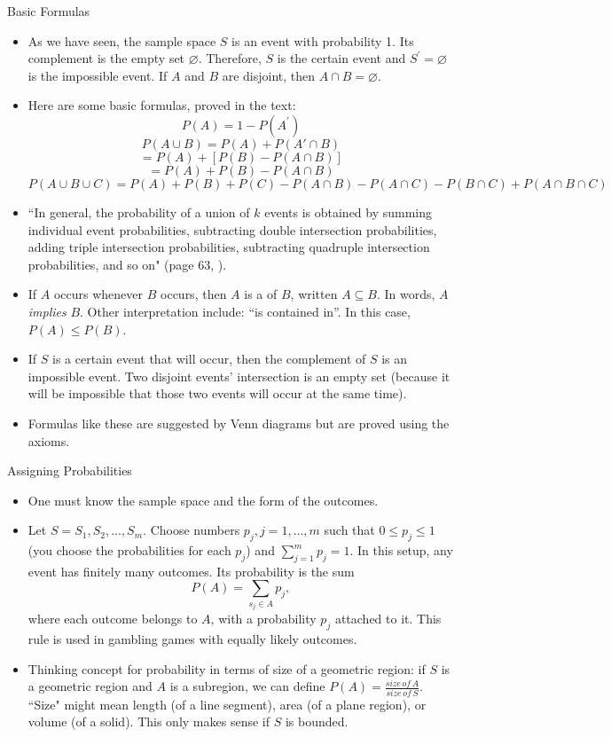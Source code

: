 Basic Formulas
\begin{itemize}
    \item As we have seen, the sample space $S$ is an event with probability 1. Its complement is the empty set $\varnothing$. Therefore, $S$ is the certain event and $S^\mathsf{'} = \varnothing$ is the impossible event. If $A$ and $B$ are disjoint, then $A \cap B = \varnothing$.
    \item Here are some basic formulas, proved in the text: $$P(A) = 1-P(A^\mathsf{'})$$
    $$P(A \cup B) = P(A) + P(A\mathsf{'} \cap B)$$
    $$ = P(A) + [P(B) - P(A \cap B)]$$
    $$ = P(A) + P(B) - P(A \cap B)$$
    $$P(A \cup B \cup C) = P(A) + P(B) + P(C) - P(A \cap B) - P(A \cap C) - P(B \cap C) + P(A \cap B \cap C)$$
\end{itemize}
\begin{itemize}
    \item ``In general, the probability of a union of $k$ events is obtained by summing individual event probabilities, subtracting double intersection probabilities, adding triple intersection probabilities, subtracting quadruple intersection probabilities, and so on" (page 63, \cite{devore}).
    \item If $A$ occurs whenever $B$ occurs, then $A$ is a  of $B$, written $A \subseteq B$. In words, $A$ \textit{implies} $B$. Other interpretation include: ``is contained in''. In this case, ${P(A)} \le {P(B)}$.
    \item If $S$ is a certain event that will occur, then the complement of $S$ is an impossible event. Two disjoint events’ intersection is an empty set (because it will be impossible that those two events will occur at the same time).
    \item Formulas like these are suggested by Venn diagrams but are proved using the axioms.
\end{itemize}
Assigning Probabilities
\begin{itemize}
    \item One must know the sample space and the form of the outcomes.
    \item Let $S = {S_{1}, S_{2}, \ldots, S_{m}}$. Choose numbers $p_{j}, j=1, \ldots, m$ such that $0 \le p_{j} \le 1$ (you choose the probabilities for each $p_{j}$) and $\sum_{j=1}^{m}p_{j}=1$. In this setup, any event has finitely many outcomes. Its probability is the sum $$P(A)=\sum_{s_{j}\in A}p_{j},$$ where each outcome belongs to $A$, with a probability $p_{j}$ attached to it. This rule is used in gambling games with equally likely outcomes.
    \item Thinking concept for probability in terms of size of a geometric region: if $S$ is a geometric region and $A$ is a subregion, we can define $P(A) = \frac{size\,of\,A}{size\,of\,S}$. ``Size" might mean length (of a line segment), area (of a plane region), or volume (of a solid). This only makes sense if $S$ is bounded.
\end{itemize}


